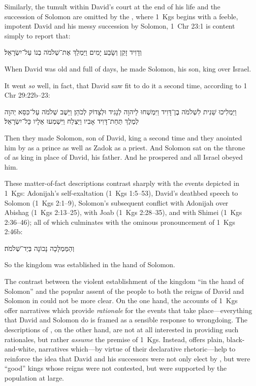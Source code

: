  Similarly, the tumult within David's court at the end of his life and the succession of Solomon are omitted by the \chronicler, where 1~Kgs begins with a feeble, impotent David and his messy succession by Solomon, 1~Chr 23:1 is content simply to report that:
\begin{hebrewtext}
    וְדָוִיד זָקֵן וְשָׂבַע יָמִים וַיַּמְלֵךְ אֶת־שְׁלֹמֹה בְנוֹ עַל־יִשְׂרָאֵל׃
\end{hebrewtext}
\begin{translation}
    When David was old and full of days, he made Solomon, his son, king over Israel.
\end{translation}
\noindent
It went \emph{so} well, in fact, that David saw fit to do it a second time, according to 1 Chr 29:22b--23:
\begin{hebrewtext}
    וַיַּמְלִיכוּ שֵׁנִית לִשְׁלֹמֹה בֶן־דָּוִיד וַיִּמְשְׁחוּ לַיהוָה לְנָגִיד וּלְצָדוֹק לְכֹהֵן׃ 
    וַיֵּשֶׁב שְׁלֹמֹה עַל־כִּסֵּא יְהוָה לְמֶלֶךְ תַּחַת־דָּוִיד אָבִיו וַיַּצְלַח וַיִּשְׁמְעוּ אֵלָיו כָּל־יִשְׂרָאֵל׃
\end{hebrewtext}
\begin{translation}
    Then they made Solomon, son of David, king a second time and they anointed him by \yahweh as a prince as well as Zadok as a priest.
    And Solomon sat on the throne of \yahweh as king in place of David, his father. And he prospered and all Israel obeyed him.
\end{translation}
\noindent
These matter-of-fact descriptions contrast sharply with the events depicted in 1~Kgs: Adonijah's self-exaltation (1~Kgs 1:5--53), David's deathbed speech to Solomon (1~Kgs 2:1--9), Solomon's subsequent conflict with Adonijah over Abishag (1~Kgs 2:13--25), with Joab (1~Kgs 2:28--35), and with Shimei (1~Kgs 2:36--46); all of which culminates with the ominous pronouncement of 1~Kgs 2:46b:
\begin{hebrewtext}
    וְהַמַּמְלָכָה נָכוֹנָה בְּיַד־שְׁלֹמֹה׃
\end{hebrewtext}
\begin{translation}
    So the kingdom was established in the hand of Solomon.
\end{translation}
The contrast between the violent establishment of the kingdom ``in the hand of Solomon'' and the popular assent of the people to both the reigns of David and Solomon in \chronicles could not be more clear. On the one hand, the accounts of 1~Kgs offer narratives which provide \emph{rationale} for the events that take place---everything that David and Solomon do is framed as a sensible response to wrongdoing. The  descriptions of \chronicles, on the other hand, are not at all interested in providing such rationales, but rather \emph{assume} the premise of 1~Kgs. Instead, \chronicles offers plain, black-and-white, narratives which---by virtue of their declarative rhetoric---help to reinforce the idea that David and his successors were not only elect by \yahweh, but were ``good'' kings whose reigns were not contested, but were supported by the population at large.

